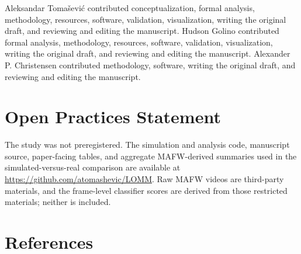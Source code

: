 \documentclass[
]{article}
\begin{document}
Aleksandar Tomašević contributed conceptualization, formal analysis,
methodology, resources, software, validation, visualization, writing the
original draft, and reviewing and editing the manuscript. Hudson Golino
contributed formal analysis, methodology, resources, software,
validation, visualization, writing the original draft, and reviewing and
editing the manuscript. Alexander P. Christensen contributed
methodology, software, writing the original draft, and reviewing and
editing the manuscript.

\section{Open Practices Statement}\label{open-practices-statement}

The study was not preregistered. The simulation and analysis code,
manuscript source, paper-facing tables, and aggregate MAFW-derived
summaries used in the simulated-versus-real comparison are available at
\url{https://github.com/atomashevic/LOMM}. Raw MAFW videos are
third-party materials, and the frame-level classifier scores are derived
from those restricted materials; neither is included.

\section{References}\label{references}

\begingroup
\setlength{\parindent}{-0.5in}
\setlength{\leftskip}{0.5in}
\end{document}
